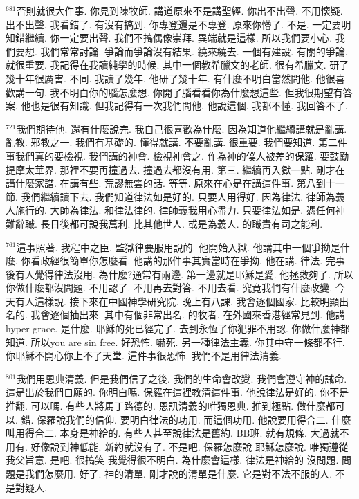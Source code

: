 \documentclass{book}
\begin{document}
$^{681}$否則就很大件事.
你見到陳牧師.
講道原來不是講聖經.
你出不出聲.
不用懷疑.
出不出聲.
我看錯了.
有沒有搞到.
你專登還是不專登.
原來你懵了.
不是.
一定要明知錯繼續.
你一定要出聲.
我們不搞偶像崇拜.
異端就是這樣.
所以我們要小心.
我們要想.
我們常常討論.
爭論而爭論沒有結果.
繞來繞去.
一個有建設.
有關的爭論.
就很重要.
我記得在我讀純學的時候.
其中一個教希臘文的老師.
很有希臘文.
研了幾十年很厲害.
不同.
我讀了幾年.
他研了幾十年.
有什麼不明白當然問他.
他很喜歡講一句.
我不明白你的腦怎麼想.
你開了腦看看你為什麼想這些.
但我很期望有答案.
他也是很有知識.
但我記得有一次我們問他.
他說這個.
我都不懂.
我回答不了.

$^{721}$我們期待他.
還有什麼說完.
我自己很喜歡為什麼.
因為知道他繼續講就是亂講.
亂教.
邪教之一.
我們有基礎的.
懂得就講.
不要亂講.
很重要.
我們要知道.
第二件事我們真的要檢視.
我們講的神會.
檢視神會之.
作為神的僕人被差的保羅.
要鼓勵提摩太華界.
那裡不要再撞過去.
撞過去都沒有用.
第三.
繼續再入獄一點.
剛才在講什麼家譜.
在講有些.
荒謬無雲的話.
等等.
原來在心是在講這件事.
第八到十一節.
我們繼續讀下去.
我們知道律法如是好的.
只要人用得好.
因為律法.
律師為義人施行的.
大師為律法.
和律法律的.
律師義我用心盡力.
只要律法如是.
憑任何神難辭職.
長日後都可說我萬利.
比其他世人.
或是為義人.
的職責有司之能利.

$^{761}$這事照著.
我程中之臣.
監獄律要服用說的.
他開始入獄.
他講其中一個爭拗是什麼.
你看政經很簡單你怎麼看.
他講的那件事其實當時在爭拗.
他在講.
律法.
完事後有人覺得律法沒用.
為什麼?通常有兩邊.
第一邊就是耶穌是愛.
他拯救夠了.
所以你做什麼都沒問題.
不用認了.
不用再去對答.
不用去看.
究竟我們有什麼改變.
今天有人這樣說.
接下來在中國神學研究院.
晚上有八課.
我會逐個國家.
比較明顯出名的.
我會逐個抽出來.
其中有個非常出名.
的牧者.
在外國來香港經常見到.
他講hyper grace.
是什麼.
耶穌的死已經完了.
去到永恆了你犯罪不用認.
你做什麼神都知道.
所以you are sin free.
好恐怖.
嚇死.
另一種律法主義.
你其中守一條都不行.
你耶穌不開心你上不了天堂.
這件事很恐怖.
我們不是用律法清義.

$^{801}$我們用恩典清義.
但是我們信了之後.
我們的生命會改變.
我們會遵守神的誡命.
這是出於我們自願的.
你明白嗎.
保羅在這裡教清這件事.
他說律法是好的.
你不是推翻.
可以嗎.
有些人將馬丁路德的.
恩訊清義的唯獨恩典.
推到極點.
做什麼都可以.
錯.
保羅說我們的信仰.
要明白律法的功用.
而這個功用.
他說要用得合二.
什麼叫用得合二.
本身是神給的.
有些人甚至說律法是舊約.
BB班.
就有規條.
大過就不用有.
好像說到神低能.
新約就沒有了.
不是吧.
保羅怎麼說 耶穌怎麼說.
唯獨遵從我父旨意.
是吧.
很搞笑 我覺得很不明白.
為什麼會這樣.
律法是神給的 沒問題.
問題是我們怎麼用.
好了.
神的清單.
剛才說的清單是什麼.
它是對不法不服的人.
不是對疑人.
\end{document}
